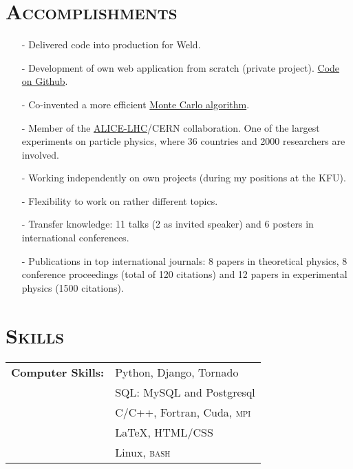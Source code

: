 \documentclass[a4paper, 10pt]{article}
\begin{document}
\vspace*{2mm}
\section{\textsc{Accomplishments}}
\vspace*{1mm}
\begin{itemize}
    \item[-] Delivered code into production for Weld.
    \item[-] Development of own web application from scratch (private project).  \href{https://github.com/ydelgadom/non_physics}{Code on Github}.\vspace{-1mm}
    \item[-] Co-invented a more efficient \href{http://inspirehep.net/record/1202877}{Monte Carlo algorithm}.
    \vspace{-1mm}
    \item[-] Member of the \href{http://home.web.cern.ch/about/experiments/alice}{ALICE-LHC}/CERN
    collaboration.  One of the largest experiments on particle physics, where 36 countries and 2000 researchers
    are involved.
    \vspace*{-1mm}
    \item[-] Working independently on own projects (during my positions at the KFU).
    \vspace*{-1mm}
    \item[-] Flexibility to work on rather different topics.
     \vspace*{-1mm}
    \item[-] Transfer knowledge: 11 talks (2 as invited speaker) 
    and 6 posters in international conferences.
     \vspace*{-1mm}
    \item[-] Publications in top international journals:
    8 papers in theoretical physics, 8 conference proceedings (total of 120 citations) and 
    12 papers in experimental physics (1500 citations).
\end{itemize}


\newpage
\section{\textsc{Skills}}
\vspace*{1mm}
\hspace*{-0.7cm}\begin{tabular}{ll}
{\bf Computer Skills:}
      & Python, Django, Tornado\vspace*{1mm}\\ 
      & SQL:  MySQL and Postgresql\vspace*{1mm}\\ 
      & C/C++, Fortran, Cuda, \textsc{mpi}\vspace*{1mm}\\
      & {\LaTeX}, HTML/CSS\vspace*{1mm}\\
      & Linux, \textsc{bash}\\
\end{tabular}\\[0.5pt]
\end{document}

